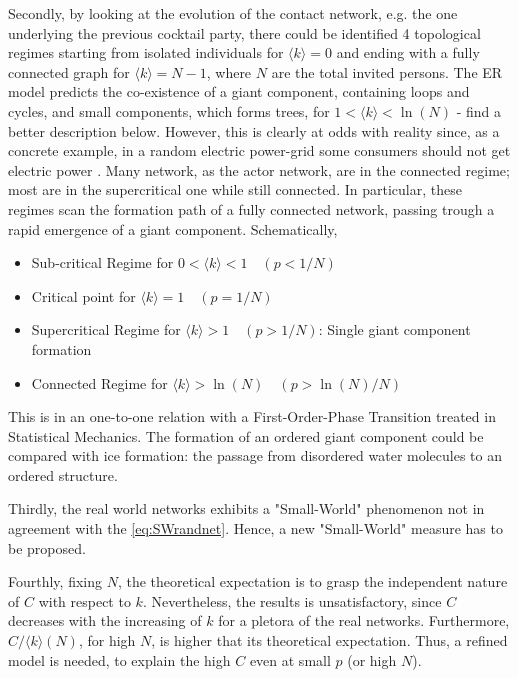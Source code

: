 \documentclass[a4paper,10pt,twoside]{book} %
\theoremstyle{definition}
\begin{document}
Secondly, by looking at the evolution of the contact network, e.g. the one underlying the previous cocktail party, there could be identified 4 topological regimes starting from isolated individuals for $\langle k \rangle = 0$ and ending with a fully connected graph for $\langle k \rangle = N-1$, where $N$ are the total invited persons. The ER model predicts the co-existence of a giant component, containing loops and cycles, and small components, which forms trees, for $1 < \langle k\rangle < \ln(N)$ - find a better description below. However, this is clearly at odds with reality since, as a concrete example, in a random electric power-grid some consumers should not get electric power \cite{barabasi::2016networkbook}. Many network, as the actor network, are in the connected regime; most are in the supercritical one while still connected.
In particular, these regimes scan the formation path of a fully connected network, passing trough a rapid emergence of a giant component.
\newline Schematically,
\begin{itemize}[noitemsep]
	\item Sub-critical Regime for $0 < \langle k \rangle < 1 \quad (p < 1/N)$ 
	\item Critical point for $\langle k \rangle = 1 \quad (p = 1/N)$
	\item Supercritical Regime for $\langle k \rangle > 1 \quad (p > 1/N)$: Single giant component formation
	\item Connected Regime for $\langle k \rangle > \ln(N) \quad (p > \ln(N)/N)$
\end{itemize}
This is in an one-to-one relation with a First-Order-Phase Transition treated in Statistical Mechanics. The formation of an ordered giant component could be compared with ice formation: the passage from disordered water molecules to an ordered structure.

Thirdly, the real world networks exhibits a "Small-World" phenomenon not in agreement with the \autoref{eq:SWrandnet}. Hence, a new "Small-World" measure has to be proposed.

Fourthly, fixing $N$, the theoretical expectation is to grasp the independent nature of $C$ with respect to $k$. Nevertheless, the results is unsatisfactory, since $C$ decreases with the increasing of $k$ for a pletora of the real networks.
Furthermore, $C/\langle k \rangle (N)$, for high $N$, is higher that its theoretical expectation. Thus, a refined model is needed, to explain the high $C$ even at small $p$ (or high $N$).
\end{document}

